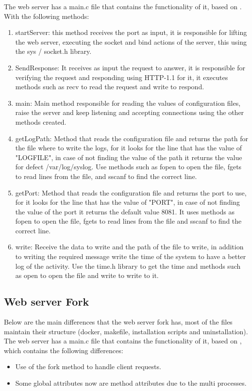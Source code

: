 \documentclass{article}
\begin{document}
The web server has a main.c file that contains the functionality of it, based on \cite{Server}.
With the following methods:
\begin{enumerate}
    \item startServer: this method receives the port as input, it is responsible for lifting the web server, executing the socket and bind actions of the server, this using the sys / socket.h library.
    \item SendResponse: It receives as input the request to answer, it is responsible for verifying the request and responding using HTTP-1.1 for it, it executes methods such as recv to read the request and write to respond.
    \item main: Main method responsible for reading the values of configuration files, raise the server and keep listening and accepting connections using the other methods created.
    \item getLogPath: Method that reads the configuration file and returns the path for the file where to write the logs, for it looks for the line that has the value of "LOGFILE", in case of not finding the value of the path it returns the value for defect /var/log/syslog. Use methods such as fopen to open the file, fgets to read lines from the file, and sscanf to find the correct line.
    \item getPort: Method that reads the configuration file and returns the port to use, for it looks for the line that has the value of "PORT", in case of not finding the value of the port it returns the default value 8081. It uses methods as fopen to open the file, fgets to read lines from the file and sscanf to find the correct line.
    \item write: Receive the data to write and the path of the file to write, in addition to writing the required message write the time of the system to have a better log of the activity. Use the time.h library to get the time and methods such as open to open the file and write to write to it.
\end{enumerate}
\subsection{Web server Fork}
Below are the main differences that the web server fork has, most of the files maintain their structure (docker, makefile, installation scripts and uninstallation).
\\The web server has a main.c file that contains the functionality of it, based on \cite{Server}, which contains the following differences:
\begin{itemize}
    \item Use of the fork method to handle client requests.
    \item Some global attributes now are method attributes due to the multi processes.
\end{itemize}
\end{document}
